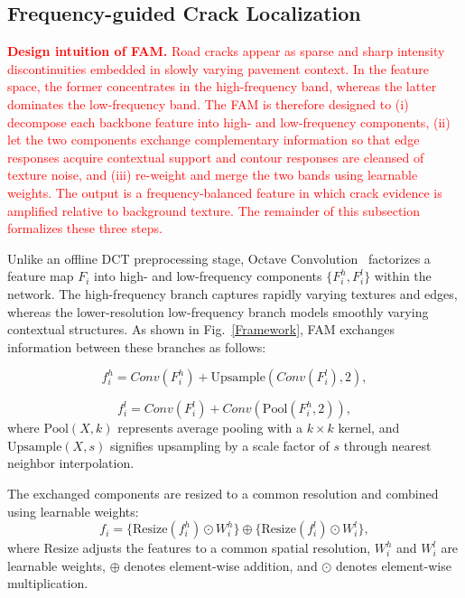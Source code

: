 \documentclass[journal]{IEEEtran}
\begin{document}
\subsection{{Frequency-guided Crack Localization}} \label{sec:Frequency-guided-Coarse-Positioning}
\textcolor{red}{\textbf{Design intuition of FAM.} Road cracks appear as sparse and sharp intensity discontinuities embedded in slowly varying pavement context. In the feature space, the former concentrates in the high-frequency band, whereas the latter dominates the low-frequency band. The FAM is therefore designed to (i) decompose each backbone feature into high- and low-frequency components, (ii) let the two components exchange complementary information so that edge responses acquire contextual support and contour responses are cleansed of texture noise, and (iii) re-weight and merge the two bands using learnable weights. The output is a frequency-balanced feature in which crack evidence is amplified relative to background texture. The remainder of this subsection formalizes these three steps.}

Unlike an offline DCT preprocessing stage, Octave Convolution~\cite{DBLP:conf/iccv/Chen0XYKRYF19} factorizes a feature map $F_i$ into high- and low-frequency components $\{F_i^h,F_i^l\}$ within the network. The high-frequency branch captures rapidly varying textures and edges, whereas the lower-resolution low-frequency branch models smoothly varying contextual structures. As shown in Fig.~\ref{Framework}, FAM exchanges information between these branches as follows:

\begin{equation}
f^{h}_{i} = Conv(F^{h}_{i}) + \text{Upsample}(Conv(F^{l}_{i}), 2),
\end{equation}

\begin{equation}
f^{l}_{i} = Conv(F^{l}_{i}) + Conv(\text{Pool}(F^{h}_{i}, 2)),
\end{equation}
where $\text{Pool}(X, k)$ represents average pooling with a $k \times k$ kernel, and $\text{Upsample}(X, s)$ signifies upsampling by a scale factor of $s$ through nearest neighbor interpolation. 

The exchanged components are resized to a common resolution and combined using learnable weights:
\begin{equation}
f_i = \{ \text{Resize}(f^{h}_{i}) \odot W^{h}_{i} \} \oplus  \{ \text{Resize}(f^{l}_{i})  \odot W^{l}_{i}  
 \},
\end{equation}
where $\text{Resize}$ adjusts the features to a common spatial resolution, $W^{h}_{i}$ and $W^{l}_{i}$ are learnable weights, $\oplus$ denotes element-wise addition, and $\odot$ denotes element-wise multiplication.
\end{document}
